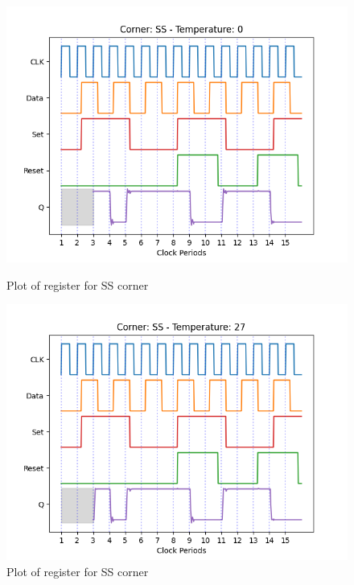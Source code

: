 \begin{figure}[H]
    \begin{minipage}{0.5\textwidth}
        \centering
        \includegraphics[width=\textwidth]{Figures/Aimspice_Plots/SS_0.png}
        \caption{Plot of register for SS corner}
        \label{fig:SS0}
    \end{minipage}%
    \begin{minipage}{0.5\textwidth}
        \centering
        \includegraphics[width=\textwidth]{Figures/Aimspice_Plots/SS_27.png}
        \caption{Plot of register for SS corner}
        \label{fig:SS27}
    \end{minipage}
\end{figure}
